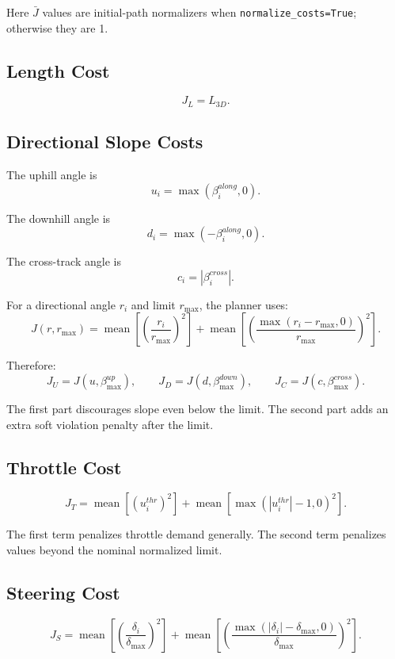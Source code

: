 \documentclass[11pt]{article}
\begin{document}
Here \(\bar{J}\) values are initial-path normalizers when \texttt{normalize\_costs=True}; otherwise they are 1.

\subsection{Length Cost}

\[
  J_L = L_{3D}.
\]

\subsection{Directional Slope Costs}

The uphill angle is
\[
  u_i = \max(\beta^{along}_i,0).
\]

The downhill angle is
\[
  d_i = \max(-\beta^{along}_i,0).
\]

The cross-track angle is
\[
  c_i = |\beta^{cross}_i|.
\]

For a directional angle \(r_i\) and limit \(r_{\max}\), the planner uses:
\[
  J(r,r_{\max}) =
  \operatorname{mean}\left[\left(\frac{r_i}{r_{\max}}\right)^2\right]
  +
  \operatorname{mean}\left[
    \left(\frac{\max(r_i-r_{\max},0)}{r_{\max}}\right)^2
  \right].
\]

Therefore:
\[
  J_U = J(u,\beta^{up}_{\max}),\qquad
  J_D = J(d,\beta^{down}_{\max}),\qquad
  J_C = J(c,\beta^{cross}_{\max}).
\]

The first part discourages slope even below the limit. The second part adds an extra soft violation penalty after the limit.

\subsection{Throttle Cost}

\[
  J_T =
  \operatorname{mean}\left[(u^{thr}_i)^2\right]
  +
  \operatorname{mean}\left[\max(|u^{thr}_i|-1,0)^2\right].
\]

The first term penalizes throttle demand generally. The second term penalizes values beyond the nominal normalized limit.

\subsection{Steering Cost}

\[
  J_S =
  \operatorname{mean}\left[\left(\frac{\delta_i}{\delta_{\max}}\right)^2\right]
  +
  \operatorname{mean}\left[
    \left(\frac{\max(|\delta_i|-\delta_{\max},0)}{\delta_{\max}}\right)^2
  \right].
\]
\end{document}
